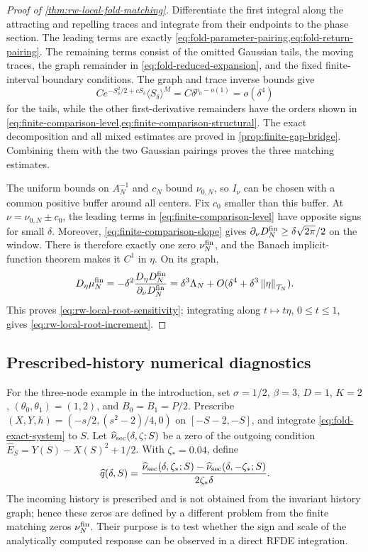 \begin{proof}[Proof of \cref{thm:rw-local-fold-matching}]
Differentiate the first integral along the attracting and repelling traces
and integrate from their endpoints to the phase section.  The leading terms
are exactly \cref{eq:fold-parameter-pairing,eq:fold-return-pairing}.  The
remaining terms consist of the omitted Gaussian tails, the moving traces,
the graph remainder in \cref{eq:fold-reduced-expansion}, and the fixed
finite-interval boundary conditions.  The graph and trace inverse bounds give
\[
 Ce^{-S_\delta^2/2+cS_\delta}\langle S_\delta\rangle^M
   =C\delta^{p_0-o(1)}=o(\delta^4)
\]
for the tails, while the other first-derivative remainders have the orders
shown in \cref{eq:finite-comparison-level,eq:finite-comparison-structural}.
The exact decomposition and all mixed estimates are proved in
\cref{prop:finite-gap-bridge}.  Combining them with the two Gaussian
pairings proves the three matching estimates.

The uniform bounds on \(A_N^{-1}\) and \(c_N\) bound \(\nu_{0,N}\), so
\(I_\nu\) can be chosen with a common positive buffer around all centers.
Fix \(c_0\) smaller than this buffer.  At
\(\nu=\nu_{0,N}\pm c_0\), the leading terms in
\cref{eq:finite-comparison-level} have opposite signs for small \(\delta\).
Moreover, \cref{eq:finite-comparison-slope} gives
\(\partial_\nu D_N^{\rm fin}\ge\delta\sqrt{2\pi}/2\) on the window.
There is therefore exactly one zero \(\nu_N^{\rm fin}\), and the
Banach implicit-function theorem makes it \(C^1\) in \(\eta\).  On its graph,
\[
 D_\eta\mu_N^{\rm fin}
 =-\delta^2\frac{D_\eta D_N^{\rm fin}}{\partial_\nu D_N^{\rm fin}}
 =\delta^3\Lambda_N+
       O(\delta^4+\delta^3\left\lVert\eta\right\rVert_{\mathcal T_N}).
\]
This proves \cref{eq:rw-local-root-sensitivity}; integrating along
\(t\mapsto t\eta\), \(0\le t\le1\), gives
\cref{eq:rw-local-root-increment}.
\end{proof}

\subsection{Prescribed-history numerical diagnostics}

For the three-node example in the introduction, set
\(\sigma=1/2\), \(\beta=3\), \(D=1\), \(K=2\),
\((\theta_0,\theta_1)=(1,2)\), and \(B_0=B_1=P/2\).
Prescribe \((X,Y,h)=(-s/2,(s^2-2)/4,0)\) on \([-S-2,-S]\), and integrate
\cref{eq:fold-exact-system} to \(S\).  Let
\(\widehat\nu_{\rm sec}(\delta,\zeta;S)\) be a zero of the outgoing
condition \(\widehat E_S=Y(S)-X(S)^2+1/2\).  With \(\zeta_*=0.04\), define
\begin{equation}
 \widehat q(\delta,S)=
 \frac{\widehat\nu_{\rm sec}(\delta,\zeta_*;S)
       -\widehat\nu_{\rm sec}(\delta,-\zeta_*;S)}{2\zeta_*\delta}.
 \label{eq:numerical-section-quotient}
\end{equation}
The incoming history is prescribed and is not obtained from the invariant
history graph; hence these zeros are defined by a different problem from
the finite matching zeros \(\nu_N^{\rm fin}\).  Their purpose is to test whether the sign and scale of
the analytically computed response can be observed in a direct RFDE
integration.

